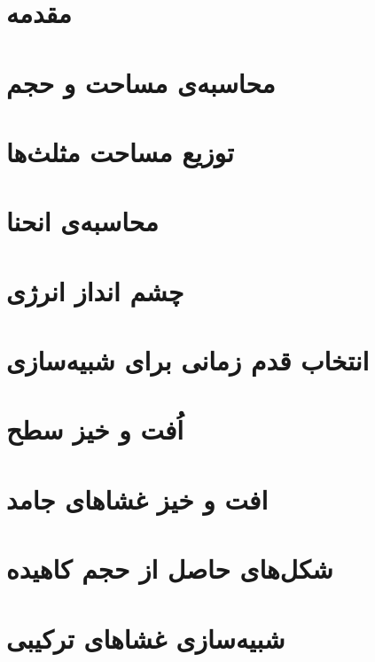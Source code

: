 \setRL
\clearpage
\def \MemRes {\Mempath /MembraneResults}

\section{
مقدمه
}



\section{
محاسبه‌ی مساحت و حجم
}


\section{
توزیع مساحت مثلث‌ها
}



\section{
محاسبه‌ی انحنا
}


\section{
چشم انداز انرژی
}


\section{
انتخاب قدم زمانی برای شبیه‌سازی
}



\section{
اُفت و خیز سطح
}






\section{
افت و خیز غشا‌های جامد
}


\section{
شکل‌های حاصل از حجم کاهیده
}


\section{
شبیه‌سازی غشاهای ترکیبی
}





